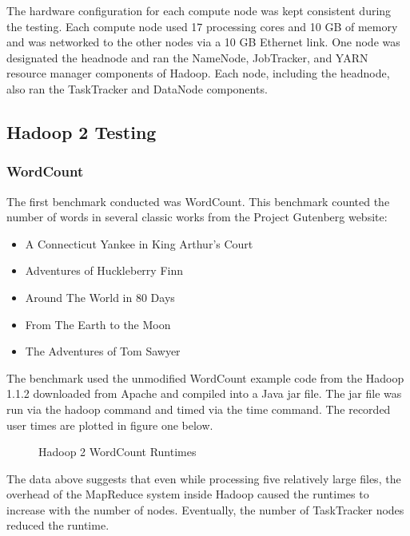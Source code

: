 \documentclass[conference]{IEEEtran}
\begin{document}
		The hardware configuration for each compute node was kept consistent during the testing. Each compute node used 17 processing cores and 10 GB of memory and was networked to the other nodes via a 10 GB Ethernet link. One node was designated the headnode and ran the NameNode, JobTracker, and YARN resource manager components of Hadoop. Each node, including the headnode, also ran the TaskTracker and DataNode components.
			\subsection{Hadoop 2 Testing}
               			\subsubsection{WordCount}
                    				The first benchmark conducted was WordCount. This benchmark counted the number of words in several classic works from the Project Gutenberg website\cite{gutenburg}:
                    				\begin{itemize}
                    				 	\item A Connecticut Yankee in King Arthur's Court\cite{yankee}
                        					\item Adventures of Huckleberry Finn\cite{huck}
                        					\item Around The World in 80 Days\cite{80days}
                      					\item From The Earth to the Moon\cite{moon}
                     					\item The Adventures of Tom Sawyer\cite{tom}
                  				\end{itemize}
						The benchmark used the unmodified WordCount example code from the Hadoop 1.1.2 downloaded from Apache and compiled into a Java jar file. The jar file was run via the hadoop command and timed via the time command. The recorded user times are plotted in figure one below.
		

                  				\begin{figure}[h]
                    					\begin{center}
                        						
                        						\caption{Hadoop 2 WordCount Runtimes}
                    					\end{center}
                  				\end{figure}
		
		The data above suggests that even while processing five relatively large files, the overhead of the MapReduce system inside Hadoop caused the runtimes to increase with the number of nodes. Eventually, the number of TaskTracker nodes reduced the runtime.
\end{document}
